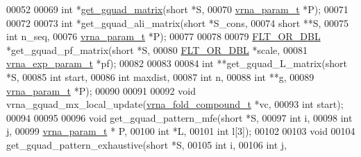 \begin{DoxyCode}
00052 
00069 \textcolor{keywordtype}{int} *\hyperlink{group__gquads_ga392e45c9615aa123737671603fa4203c}{get\_gquad\_matrix}(\textcolor{keywordtype}{short}         *S,
00070                       \hyperlink{group__energy__parameters_structvrna__param__s}{vrna\_param\_t}  *P);
00071 
00072 
00073 \textcolor{keywordtype}{int} *get\_gquad\_ali\_matrix(\textcolor{keywordtype}{short}         *S\_cons,
00074                           \textcolor{keywordtype}{short}         **S,
00075                           \textcolor{keywordtype}{int}           n\_seq,
00076                           \hyperlink{group__energy__parameters_structvrna__param__s}{vrna\_param\_t}  *P);
00077 
00078 
00079 \hyperlink{group__data__structures_ga31125aeace516926bf7f251f759b6126}{FLT\_OR\_DBL} *get\_gquad\_pf\_matrix(\textcolor{keywordtype}{short}             *S,
00080                                 \hyperlink{group__data__structures_ga31125aeace516926bf7f251f759b6126}{FLT\_OR\_DBL}        *scale,
00081                                 \hyperlink{group__energy__parameters_structvrna__exp__param__s}{vrna\_exp\_param\_t}  *pf);
00082 
00083 
00084 \textcolor{keywordtype}{int} **get\_gquad\_L\_matrix(\textcolor{keywordtype}{short}        *S,
00085                          \textcolor{keywordtype}{int}          start,
00086                          \textcolor{keywordtype}{int}          maxdist,
00087                          \textcolor{keywordtype}{int}          n,
00088                          \textcolor{keywordtype}{int}          **g,
00089                          \hyperlink{group__energy__parameters_structvrna__param__s}{vrna\_param\_t} *P);
00090 
00091 
00092 \textcolor{keywordtype}{void}        vrna\_gquad\_mx\_local\_update(\hyperlink{group__fold__compound_structvrna__fc__s}{vrna\_fold\_compound\_t} *vc,
00093                                        \textcolor{keywordtype}{int}                  start);
00094 
00095 
00096 \textcolor{keywordtype}{void} get\_gquad\_pattern\_mfe(\textcolor{keywordtype}{short} *S,
00097                            \textcolor{keywordtype}{int} i,
00098                            \textcolor{keywordtype}{int} j,
00099                            \hyperlink{group__energy__parameters_structvrna__param__s}{vrna\_param\_t} * P,
00100                            \textcolor{keywordtype}{int} *L,
00101                            \textcolor{keywordtype}{int} l[3]);
00102 
00103 \textcolor{keywordtype}{void}
00104 get\_gquad\_pattern\_exhaustive(\textcolor{keywordtype}{short}        *S,
00105                              \textcolor{keywordtype}{int}          i,
00106                              \textcolor{keywordtype}{int}          j,

\end{DoxyCode}
